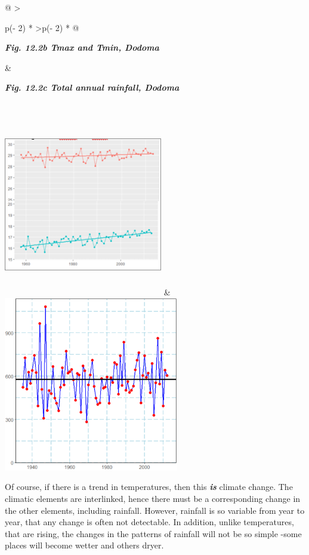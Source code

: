 \documentclass[
  letterpaper,
  DIV=11,
  numbers=noendperiod]{scrreprt}
\begin{document}
\begin{longtable}[]{@{}
  >{\raggedright\arraybackslash}p{(\columnwidth - 2\tabcolsep) * }
  >{\raggedleft\arraybackslash}p{(\columnwidth - 2\tabcolsep) * }@{}}
\toprule\noalign{}
\begin{minipage}[b]{\linewidth}\raggedright
\textbf{\emph{Fig. 12.2b Tmax and Tmin, Dodoma}}
\end{minipage} & \begin{minipage}[b]{\linewidth}\raggedleft
\textbf{\emph{Fig. 12.2c Total annual rainfall, Dodoma}}
\end{minipage} \\
\midrule\noalign{}
\endhead
\bottomrule\noalign{}
\endlastfoot
\includegraphics[width=2.7294in,height=3.16914in]{figures/Fig12.2b.png}
&
\includegraphics[width=3.0079in,height=3.0044in]{figures/Fig12.2c.png} \\
\end{longtable}

Of course, if there is a trend in temperatures, then this
\textbf{\emph{is}} climate change. The climatic elements are
interlinked, hence there must be a corresponding change in the other
elements, including rainfall. However, rainfall is so variable from year
to year, that any change is often not detectable. In addition, unlike
temperatures, that are rising, the changes in the patterns of rainfall
will not be so simple -some places will become wetter and others dryer.
\end{document}
